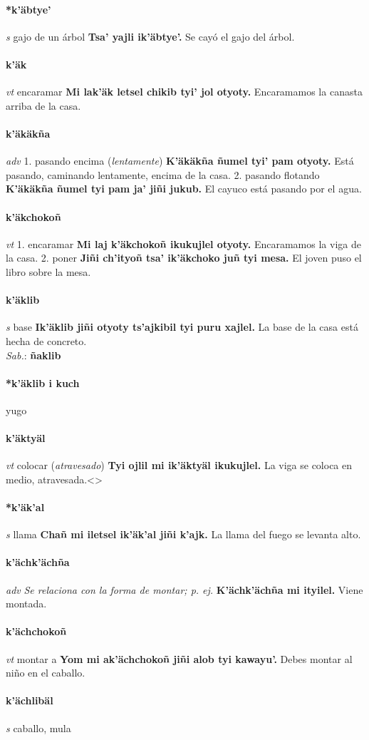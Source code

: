 \documentclass{scrbook}
\newcommand{\entry}[1]{\paragraph{#1}}
\newcommand{\onedefinition}[1]{#1.}
\newcommand{\nontranslationdef}[1]{\textit{#1}}
\newcommand{\partofspeech}[1]{\textit{#1}}
\newcommand{\spanishtranslation}[1]{#1}
\newcommand{\clarification}[1]{(\textit{#1})}
\newcommand{\cholexample}[1]{\textbf{#1}}
\newcommand{\exampletranslation}[1]{#1}
\newcommand{\dialectvariant}[1]{\\\textit{#1}:}
\newcommand{\dialectword}[1]{\textbf{#1}}
\begin{document}
\begin{multicols}{2}
\entry{*k'äbtye'}
\partofspeech{s}
\spanishtranslation{gajo de un árbol}
\cholexample{Tsa' yajli ik'äbtye'.}
\exampletranslation{Se cayó el gajo del árbol.}

\entry{k'äk}
\partofspeech{vt}
\spanishtranslation{encaramar}
\cholexample{Mi lak'äk letsel chikib tyi' jol otyoty.}
\exampletranslation{Encaramamos la canasta arriba de la casa.}

\entry{k'äkäkña}
\partofspeech{adv}
\onedefinition{1}
\spanishtranslation{pasando encima}
\clarification{lentamente}
\cholexample{K'äkäkña ñumel tyi' pam otyoty.}
\exampletranslation{Está pasando, caminando lentamente, encima de la casa.}
\onedefinition{2}
\spanishtranslation{pasando flotando}
\cholexample{K'äkäkña ñumel tyi pam ja' jiñi jukub.}
\exampletranslation{El cayuco está pasando por el agua.}

\entry{k'äkchokoñ}
\partofspeech{vt}
\onedefinition{1}
\spanishtranslation{encaramar}
\cholexample{Mi laj k'äkchokoñ ikukujlel otyoty.}
\exampletranslation{Encaramamos la viga de la casa.}
\onedefinition{2}
\spanishtranslation{poner}
\cholexample{Jiñi ch'ityoñ tsa' ik'äkchoko juñ tyi mesa.}
\exampletranslation{El joven puso el libro sobre la mesa.}

\entry{k'äklib}
\partofspeech{s}
\spanishtranslation{base}
\cholexample{Ik'äklib jiñi otyoty ts'ajkibil tyi puru xajlel.}
\exampletranslation{La base de la casa está hecha de concreto.}
\dialectvariant{Sab.}
\dialectword{ñaklib}

\entry{*k'äklib i kuch}
\spanishtranslation{yugo}

\entry{k'äktyäl}
\partofspeech{vt}
\spanishtranslation{colocar}
\clarification{atravesado}
\cholexample{Tyi ojlil mi ik'äktyäl ikukujlel.}
\exampletranslation{La viga se coloca en medio, atravesada.<>}

\entry{*k'äk'al}
\partofspeech{s}
\spanishtranslation{llama}
\cholexample{Chañ mi iletsel ik'äk'al jiñi k'ajk.}
\exampletranslation{La llama del fuego se levanta alto.}

\entry{k'ächk'ächña}
\partofspeech{adv}
\nontranslationdef{Se relaciona con la forma de montar; p. ej.}
\cholexample{K'ächk'ächña mi ityilel.}
\exampletranslation{Viene montada.}

\entry{k'ächchokoñ}
\partofspeech{vt}
\spanishtranslation{montar a}
\cholexample{Yom mi ak'ächchokoñ jiñi alob tyi kawayu'.}
\exampletranslation{Debes montar al niño en el caballo.}

\entry{k'ächlibäl}
\partofspeech{s}
\spanishtranslation{caballo, mula}


\end{multicols}
\end{document}
